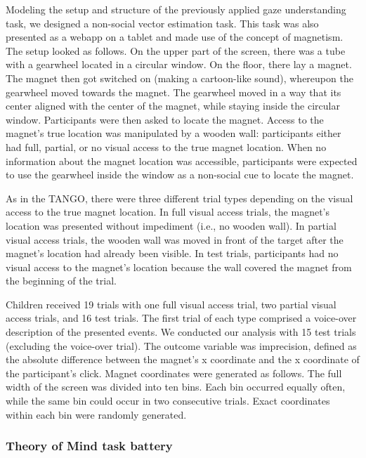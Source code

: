 \documentclass[
  man,floatsintext]{apa6}
\begin{document}
Modeling the setup and structure of the previously applied gaze understanding task, we designed a non-social vector estimation task.
This task was also presented as a webapp on a tablet and made use of the concept of magnetism.
The setup looked as follows.
On the upper part of the screen, there was a tube with a gearwheel located in a circular window.
On the floor, there lay a magnet.
The magnet then got switched on (making a cartoon-like sound), whereupon the gearwheel moved towards the magnet.
The gearwheel moved in a way that its center aligned with the center of the magnet, while staying inside the circular window.
Participants were then asked to locate the magnet.
Access to the magnet's true location was manipulated by a wooden wall: participants either had full, partial, or no visual access to the true magnet location.
When no information about the magnet location was accessible, participants were expected to use the gearwheel inside the window as a non-social cue to locate the magnet.

As in the TANGO, there were three different trial types depending on the visual access to the true magnet location.
In full visual access trials, the magnet's location was presented without impediment (i.e., no wooden wall).
In partial visual access trials, the wooden wall was moved in front of the target after the magnet's location had already been visible.
In test trials, participants had no visual access to the magnet's location because the wall covered the magnet from the beginning of the trial.

Children received 19 trials with one full visual access trial, two partial visual access trials, and 16 test trials.
The first trial of each type comprised a voice-over description of the presented events.
We conducted our analysis with 15 test trials (excluding the voice-over trial).
The outcome variable was imprecision, defined as the absolute difference between the magnet's x coordinate and the x coordinate of the participant's click.
Magnet coordinates were generated as follows.
The full width of the screen was divided into ten bins.
Each bin occurred equally often, while the same bin could occur in two consecutive trials.
Exact coordinates within each bin were randomly generated.

\hypertarget{theory-of-mind-task-battery}{%
\subsubsection{Theory of Mind task battery}\label{theory-of-mind-task-battery}}
\end{document}
